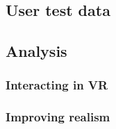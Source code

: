 \subsection{User test data}




\subsection{Analysis}


\subsubsection{Interacting in VR}



\subsubsection{Improving realism}




\cleardoublepage